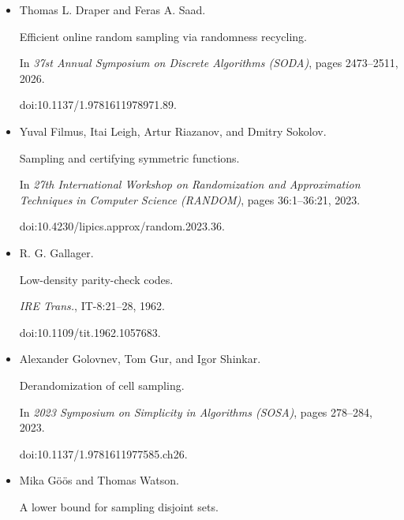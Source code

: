 \documentclass[10pt,a4paper]{article}
\begin{document}
\begin{itemize}
doi:10.1145/1806689.1806771.





\item[] 
[16]

Thomas L. Draper and Feras A. Saad.


Efficient online random sampling via randomness recycling.


In \emph{37st Annual Symposium on Discrete Algorithms (SODA)}, pages
2473–2511, 2026.


doi:10.1137/1.9781611978971.89.





\item[] 
[17]

Yuval Filmus, Itai Leigh, Artur Riazanov, and Dmitry Sokolov.


Sampling and certifying symmetric functions.


In \emph{27th International Workshop on Randomization and
Approximation Techniques in Computer Science (RANDOM)}, pages 36:1–36:21,
2023.


doi:10.4230/lipics.approx/random.2023.36.





\item[] 
[18]

R. G. Gallager.


Low-density parity-check codes.


\emph{IRE Trans.}, IT-8:21–28, 1962.


doi:10.1109/tit.1962.1057683.





\item[] 
[19]

Alexander Golovnev, Tom Gur, and Igor Shinkar.


Derandomization of cell sampling.


In \emph{2023 Symposium on Simplicity in Algorithms (SOSA)}, pages
278–284, 2023.


doi:10.1137/1.9781611977585.ch26.





\item[] 
[20]

Mika Göös and Thomas Watson.


A lower bound for sampling disjoint sets.



\end{itemize}
\end{document}
